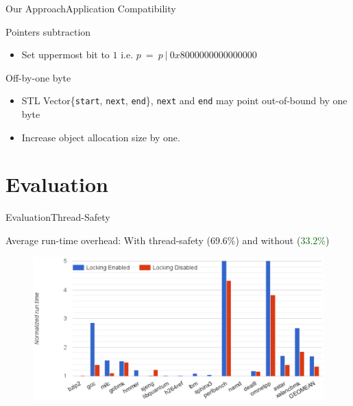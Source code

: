 \documentclass{beamer}
\begin{document}
\begin{frame}{Our Approach}{Application Compatibility}
	
\begin{block}{Pointers subtraction}
\begin{itemize}
 
	
\item Set uppermost bit to $1$ i.e. $p\ =\ p\ |\ 0x8000000000000000$
\end{itemize}
\end{block}

\begin{block}{Off-by-one byte}
\begin{itemize}
\item STL Vector\{\texttt{start}, \texttt{next}, \texttt{end}\}, \texttt{next} and \texttt{end} may point out-of-bound by one byte
\item Increase object allocation size by one.
\end{itemize}
\end{block}
\end{frame}

%
%

\section{Evaluation}
\begin{frame}{Evaluation}{Thread-Safety}
\begin{block}{}
Average run-time overhead: With thread-safety ({\color{red}$69.6\%$}) and without ({\textcolor{darkgreen}{$33.2\%$}})
\end{block}

\begin{figure}[h]
	\centering
	\includegraphics[width=4.5in]{metalloc-freesentry_graph.eps} 
\end{figure}

\end{frame}
\end{document}
